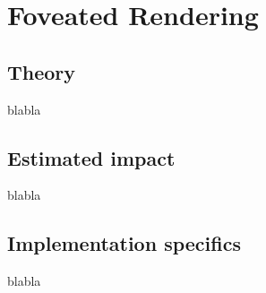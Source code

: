 
\section{Foveated Rendering}
\subsection{Theory}
blabla
\subsection{Estimated impact}
blabla
\subsection{Implementation specifics}
blabla
